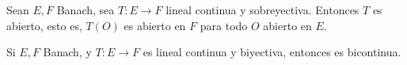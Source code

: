 \documentclass{notetaking}
\begin{document}
\begin{thm}
    Sean \(E,F\) Banach, sea \(T:E\rightarrow F\) lineal continua y sobreyectiva. Entonces \(T\) es abierto, esto es, \(T(O)\) es abierto en \(F\) para todo \(O\) abierto en \(E\).
\end{thm}
\begin{cor}
    Si \(E,F\) Banach, y \(T:E\rightarrow F\) es lineal continua y biyectiva, entonces es bicontinua.
\end{cor}
\end{document}
